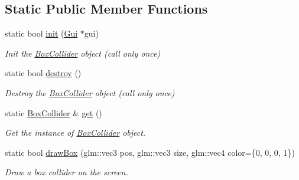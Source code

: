 \subsection*{Static Public Member Functions}
\begin{DoxyCompactItemize}
\item 
static bool \hyperlink{class_box_collider_a6f8b8b22f9845496c422236140818209}{init} (\hyperlink{class_gui}{Gui} $\ast$gui)
\begin{DoxyCompactList}\small\item\em Init the \hyperlink{class_box_collider}{Box\+Collider} object (call only once) \end{DoxyCompactList}\item 
static bool \hyperlink{class_box_collider_a3fd8069de8cba507e4b3ac66b995d632}{destroy} ()
\begin{DoxyCompactList}\small\item\em Destroy the \hyperlink{class_box_collider}{Box\+Collider} object (call only once) \end{DoxyCompactList}\item 
static \hyperlink{class_box_collider}{Box\+Collider} \& \hyperlink{class_box_collider_a830532bce2aa57c773c8d7617cc8fe2b}{get} ()
\begin{DoxyCompactList}\small\item\em Get the instance of \hyperlink{class_box_collider}{Box\+Collider} object. \end{DoxyCompactList}\item 
static bool \hyperlink{class_box_collider_a4a5eccd572ec94bf11fab22fa24765ac}{draw\+Box} (glm\+::vec3 pos, glm\+::vec3 size, glm\+::vec4 color=\{0, 0, 0, 1\})
\begin{DoxyCompactList}\small\item\em Draw a box collider on the screen. \end{DoxyCompactList}\end{DoxyCompactItemize}

